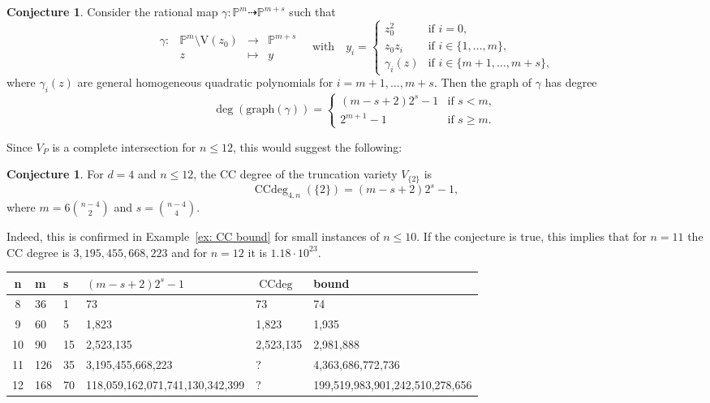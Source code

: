 \documentclass[11pt,reqno]{amsart}
\theoremstyle{definition}
\newtheorem{conjecture}[theorem]{Conjecture}
\numberwithin{theorem}{section}
\newcommand{\CCdeg}{\operatorname{CCdeg}}
\numberwithin{equation}{section}
\begin{document}
\begin{conjecture}
Consider the rational map $\gamma: \mathbb P^m \dashrightarrow \mathbb P^{m+s}$ such that 
\[ \begin{matrix}
\gamma: & \mathbb P^m \setminus \textrm{V}(z_0) & \longrightarrow & \mathbb P^{m+s}\\
& z & \mapsto & y 
\end{matrix} \quad \text{with} \quad y_i = \begin{cases}
    z_0^2 & \text{if }i=0,\\
    z_0z_i & \text{if } i \in \{1,\ldots,m\},\\
    \gamma_i(z) & \text{if } i \in \{ m+1, \ldots, m+s\},
\end{cases}
\]
where $\gamma_i(z)$ are general homogeneous quadratic polynomials for $i=m+1,\ldots, m+s$. Then the graph of $\gamma$ has degree
\[ \deg(\text{graph}(\gamma)) = \begin{cases}
(m - s + 2)2^s -1 & \text{if } s<m, \\
2^{m+1}-1 & \text{if } s \geq m.
\end{cases} \]
\end{conjecture}

\noindent Since $V_P$ is a complete intersection for $n \leq 12$, this would suggest the following:

\begin{conjecture}\label{conj: CC degree}
    For $d=4$ and $n \leq 12$, the CC degree of the truncation variety $V_{\{2\}}$ is 
    $$ \CCdeg_{4,n}(\{2\}) =
    (m - s + 2)2^s -1,$$ where $m = 6{{n-4}\choose 2}$ and $s={{n-4}\choose 4}$.
\end{conjecture}

\noindent Indeed, this is confirmed in Example~\ref{ex: CC bound} for small instances of $n \leq 10$. If the conjecture is true, this implies that for $n=11$ the CC degree is $ 3{,}195{,}455{,}668{,}223$ and for $n=12$ it is $1.18 \cdot 10^{23}$.
\begin{center}
    \begin{tabular}{c|l|l|l|l|l}
         n & m & s & $(m-s+2)2^s-1$ & $\CCdeg$ & bound \\
         \hline
         8 & 36 & 1 & 73 & 73 & 74\\
        9 & 60 & 5 & 1{,}823 & 1{,}823 & 1{,}935\\
        10 & 90 & 15 & 2{,}523{,}135 & 2{,}523{,}135 & 2{,}981{,}888 \\
        11 & 126 & 35 & 3{,}195{,}455{,}668{,}223 &? & 4{,}363{,}686{,}772{,}736\\
        12 & 168 & 70 & 118{,}059{,}162{,}071{,}741{,}130{,}342{,}399 & ?& 199{,}519{,}983{,}901{,}242{,}510{,}278{,}656
    \end{tabular}
\end{center}
\end{document}
